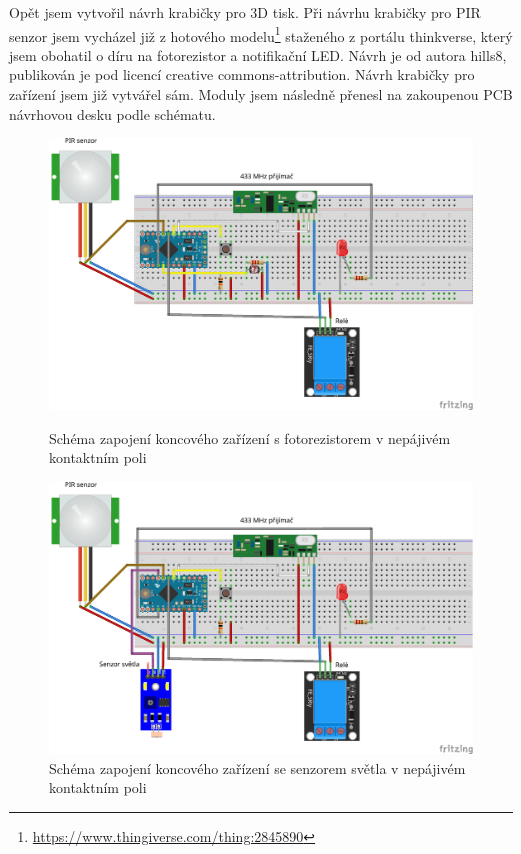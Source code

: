 \documentclass[11pt,a4paper,twoside,openright]{report}
\begin{document}
	
	Opět jsem vytvořil návrh krabičky pro 3D tisk. Při návrhu krabičky pro PIR senzor jsem vycházel již z hotového modelu\footnote{\url{https://www.thingiverse.com/thing:2845890}} staženého z portálu thinkverse, který jsem obohatil o díru na fotorezistor a notifikační LED. Návrh je od autora hills8, publikován je pod licencí creative commons-attribution. Návrh krabičky pro zařízení jsem již vytvářel sám. Moduly jsem následně přenesl na zakoupenou PCB návrhovou desku podle schématu.
	
	\begin{figure}
		\centering
		\includegraphics[width=1\hsize]{img/přijímač_zásuvka_bb.png}
		\caption{Schéma zapojení koncového zařízení s fotorezistorem v nepájivém kontaktním poli}
		
		\includegraphics[width=1\hsize]{img/přijímač_zásuvka_modul_bb.png}
		\caption{Schéma zapojení koncového zařízení se senzorem světla v nepájivém kontaktním poli}
	\end{figure}
	
\end{document}
